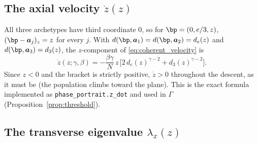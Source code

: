 \documentclass[11pt,a4paper]{article}
\theoremstyle{plain}
\theoremstyle{definition}
\theoremstyle{remark}
\newcommand{\ba}{\bm{a}}
\newcommand{\lam}{\lambda}
\newcommand{\bw}{\beta}
\newcommand{\de}{d_e}
\newcommand{\dth}{d_3}
\begin{document}
\subsection{The axial velocity $\dot z(z)$}
\label{app:axial_derivation}

All three archetypes have third coordinate $0$, so for $\bp=(0,e/3,z)$,
$(\bp-\ba_j)_z=z$ for every $j$. With $d(\bp,\ba_1)=d(\bp,\ba_2)=\de(z)$
and $d(\bp,\ba_3)=\dth(z)$, the $z$-component of \eqref{eq:coherent_velocity} is
\begin{equation}
\dot z(z;\gamma,\bw)=-\frac{\bw\gamma}{N}\,z\,\Big[2\,\de(z)^{\gamma-2}+\dth(z)^{\gamma-2}\Big].
\label{eq:zdot}
\end{equation}
Since $z<0$ and the bracket is strictly positive, $\dot z>0$ throughout the
descent, as it must be (the population climbs toward the plane). This is
the exact formula implemented as \texttt{phase\_portrait.z\_dot} and used in
$\Gamma$ (Proposition~\ref{prop:threshold}).

\subsection{The transverse eigenvalue $\lam_x(z)$}
\end{document}
